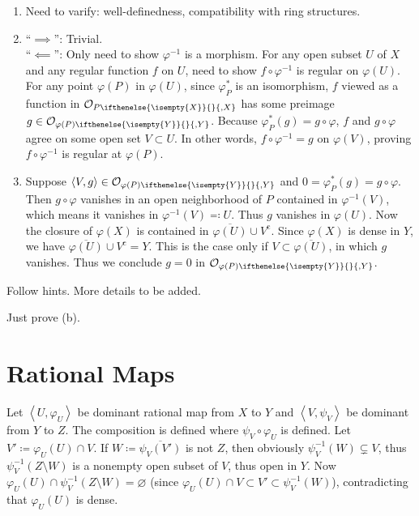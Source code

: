 \documentclass{note}
\newcommand{\lring}[2][]{\mathcal{O}_{#2\ifthenelse{\isempty{#1}}{}{,#1}}}
\newcommand{\union}{\cup}
\newcommand{\closure}{\overline}
\newcommand{\cmpl}[1]{#1^\text{c}}
\newcommand{\chevrons}[1]{\left\langle#1\right\rangle}
\newcommand{\rational}[2]{\chevrons{#1,#2}}
\begin{document}
\setcounter{exercise}{2}
\Ex
\begin{enumerate}
  \item Need to varify: well-definedness, compatibility with ring structures.
  \item ``$\implies$'': Trivial.\\ ``$\impliedby$'': Only need to
        show $\varphi^{-1}$ is a morphism. For any open subset $U$ of $X$ and any
        regular function $f$ on $U$, need to show $f\circ\varphi^{-1}$ is regular on
        $\varphi(U)$. For any point $\varphi(P)$ in $\varphi(U)$, since $\varphi_P^*$
        is an isomorphism, $f$ viewed as a function in $\lring[X]{P}$ has some preimage
        $g\in\lring[Y]{\varphi(P)}$. Because $\varphi_P^*(g) = g\circ\varphi$, $f$ and
        $g\circ\varphi$ agree on some open set $V\subset U$. In other words,
        $f\circ\varphi^{-1} = g$ on $\varphi(V)$, proving $f\circ\varphi^{-1}$ is
        regular at $\varphi(P)$.
  \item Suppose $\chevrons{V,g}\in\lring[Y]{\varphi(P)}$ and $0 = \varphi_P^*(g) =
          g\circ\varphi$. Then $g\circ\varphi$ vanishes in an open neighborhood of $P$
        contained in $\varphi^{-1}(V)$, which means it vanishes in
        $\varphi^{-1}(V)\eqqcolon U$. Thus $g$ vanishes in $\varphi(U)$. Now the
        closure of $\varphi(X)$ is contained in $\closure{\varphi(U)}\union\cmpl{V}$.
        Since $\varphi(X)$ is dense in $Y$, we have $\closure{\varphi(U)}\union\cmpl{V}
          = Y$. This is the case only if $V\subset\closure{\varphi(U)}$, in which $g$
        vanishes. Thus we conclude $g = 0$ in $\lring[Y]{\varphi(P)}$.
\end{enumerate}

\setcounter{exercise}{4}
\Ex
Follow hints. More details to be added.

\setcounter{exercise}{6}
\Ex
Just prove (b).

\section{Rational Maps}
Let $\rational{U}{\varphi_U}$ be dominant rational map from $X$ to $Y$ and
$\rational{V}{\psi_V}$ be dominant from $Y$ to $Z$. The composition is defined
where $\psi_V\circ\varphi_U$ is defined. Let $V'\coloneqq\varphi_U(U)\cap V$.
If $W\coloneqq\closure{\psi_V(V')}$ is not $Z$, then obviously $\psi_V^{-1}(W)
  \subsetneq V$, thus $\psi_V^{-1}(Z\setminus W)$ is a nonempty open subset of
$V$, thus open in $Y$. Now $\varphi_U(U) \cap \psi_V^{-1}(Z\setminus W) =
  \varnothing$ (since $\varphi_U(U) \cap V \subset V' \subset \psi_V^{-1}(W)$),
contradicting that $\varphi_U(U)$ is dense.
\end{document}
